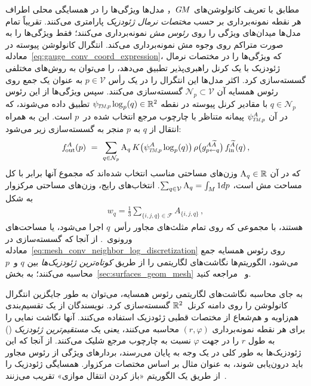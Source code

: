 مطابق با تعریف کانولوشن‌های $G\mkern-1.4muM$， مدل‌ها ویژگی‌ها را در همسایگی محلی اطراف هر نقطه نمونه‌برداری بر حسب \emph{مختصات نرمال ژئودزیک} پارامتری می‌کنند.
تقریباً تمام مدل‌ها میدان‌های ویژگی را روی \emph{رئوس مش} نمونه‌برداری می‌کنند؛ فقط \citet{huang2019texturenet} ویژگی‌ها را به صورت متراکم روی وجوه مش نمونه‌برداری می‌کند.
انتگرال کانولوشن پیوسته در معادله~\eqref{eq:gauge_conv_coord_expression}، که ویژگی‌ها را در مختصات نرمال ژئودزیک با یک کرنل راهبری‌پذیر تطبیق می‌دهد، را می‌توان به روش‌های مختلفی گسسته‌سازی کرد.
اکثر مدل‌ها این انتگرال را در یک رأس $p\in\mathcal{V}$ به عنوان یک جمع روی رئوس همسایه آن $\mathcal{N}_p \subset \mathcal{V}$ گسسته‌سازی می‌کنند.
سپس ویژگی‌ها از این رئوس $q\in\mathcal{N}_p$ با مقادیر کرنل پیوسته در نقطه $\psiTMp \log_p(q) \in \R^2$ تطبیق داده می‌شوند، که در آن $\psiTMp^A$ پیمانه متناظر با چارچوب مرجع انتخاب شده در~$p$ است.
این به همراه انتقال از $q$ به $p$ منجر به گسسته‌سازی زیر می‌شود:
\begin{align}\label{eq:mesh_conv_neighbor_log_discretization}
    \fout^A(p)\ =\ \sum_{q\in\mathcal{N}_p} \textup{A}_q\, K\big(\psiTMp^A \log_p(q)\big)\, \rho\big( g^{A\widetilde{A}}_{p\leftarrow q} \big)\, \fin^{\widetilde{A}}(q) \,,
\end{align}
که در آن $\textup{A}_q \in \mathbb{R}$ وزن‌های مساحتی مناسب انتخاب شده‌اند که مجموع آنها برابر با کل مساحت مش است، ${\sum_{q\in\mathcal{V}} \textup{A}_q = \int_M 1 dp}$.
انتخاب‌های رایج، وزن‌های مساحتی مرکزوار به شکل
\begin{align}\label{eq:triangle_area_weights}
    w_q = \frac{1}{3} \sum_{\{i,j,q\}\in\mathcal{F}} A_{\{i,j,q\}} \,,
\end{align}
هستند، با مجموعی که روی تمام مثلث‌های مجاور رأس~$q$ اجرا می‌شود، یا مساحت‌های ورونوی~\cite{vouga2014lectures}.
از آنجا که گسسته‌سازی در معادله~\eqref{eq:mesh_conv_neighbor_log_discretization} روی رئوس همسایه جمع می‌شود، الگوریتم‌ها نگاشت‌های لگاریتمی را از طریق \emph{کوتاه‌ترین ژئودزیک‌ها} بین $q$ و~$p$ محاسبه می‌کنند؛ به بخش~\ref{sec:surfaces_geom_mesh} و~\cite{polthier1998straightest} مراجعه کنید.

به جای محاسبه نگاشت‌های لگاریتمی رئوس همسایه، می‌توان به طور جایگزین انتگرال کانولوشن را روی دامنه کرنل~$\mathbb{R}^2$ گسسته‌سازی کرد.
نویسندگان \cite{masci2015geodesic} از یک تقسیم‌بندی هم‌زاویه و هم‌شعاع از مختصات قطبی ژئودزیک استفاده می‌کنند.
آنها نگاشت نمایی را برای هر نقطه نمونه‌برداری $(r,\varphi)$ محاسبه می‌کنند، یعنی یک \emph{مستقیم‌ترین ژئودزیک} (\cite{polthier1998straightest}) به طول $r$ را در جهت $\varphi$ نسبت به چارچوب مرجع شلیک می‌کنند.
از آنجا که این ژئودزیک‌ها به طور کلی در یک وجه به پایان می‌رسند، بردارهای ویژگی از رئوس مجاور باید درون‌یابی شوند،
به عنوان مثال بر اساس مختصات مرکزوار.
\citet{Yang2020parallelFrameCNN} همسایگی ژئودزیک را از طریق یک الگوریتم «باز کردن انتقال موازی» تقریب می‌زنند~\cite{budninskiy2018parallel}.



